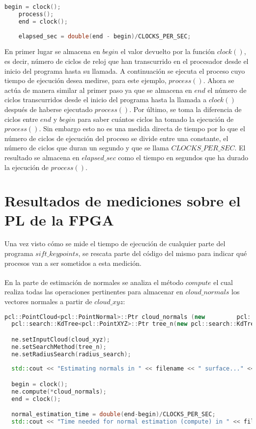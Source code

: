 \begin{lstlisting}[language=C++,breaklines]
	begin = clock();
	process();
	end = clock();
	
	elapsed_sec = double(end - begin)/CLOCKS_PER_SEC;
\end{lstlisting}

En primer lugar se almacena en $begin$ el valor devuelto por la función $clock()$, es decir, número de ciclos de reloj que han transcurrido en el procesador desde el inicio del programa hasta su llamada. A continuación se ejecuta el proceso cuyo tiempo de ejecución desea medirse, para este ejemplo, $process()$. Ahora se actúa de manera similar al primer paso ya que se almacena en $end$ el número de ciclos transcurridos desde el inicio del programa hasta la llamada a $clock()$ después de haberse ejecutado $process()$. Por último, se toma la diferencia de ciclos entre $end$ y $begin$ para saber cuántos ciclos ha tomado la ejecución de $process()$. Sin embargo esto no es una medida directa de tiempo por lo que el número de ciclos de ejecución del proceso se divide entre una constante, el número de ciclos que duran un segundo y que se llama $CLOCKS\_PER\_SEC$. El resultado se almacena en $elapsed\_sec$ como el tiempo en segundos que ha durado la ejecución de $process()$.


\section{Resultados de mediciones sobre el PL de la FPGA}
Una vez visto cómo se mide el tiempo de ejecución de cualquier parte del programa $sift\_keypoints$, se rescata parte del código del mismo para indicar qué procesos van a ser sometidos a esta medición.
\\
\\
En la parte de estimación de normales se analiza el método $compute$ el cual realiza todas las operaciones pertinentes para almacenar en $cloud\_normals$ los vectores normales a partir de $cloud\_xyz$:


\begin{lstlisting}[language=C++,breaklines]
  pcl::PointCloud<pcl::PointNormal>::Ptr cloud_normals (new 		pcl::PointCloud<pcl::PointNormal>);
  pcl::search::KdTree<pcl::PointXYZ>::Ptr tree_n(new pcl::search::KdTree<pcl::PointXYZ>());

  ne.setInputCloud(cloud_xyz);
  ne.setSearchMethod(tree_n);
  ne.setRadiusSearch(radius_search);
 
  std::cout << "Estimating normals in " << filename << " surface..." <<std::endl;

  begin = clock();
  ne.compute(*cloud_normals);
  end = clock();

  normal_estimation_time = double(end-begin)/CLOCKS_PER_SEC;
  std::cout << "Time needed for normal estimation (compute) in " << filename << ": " << normal_estimation_time << " seconds" << std::endl << std::endl;
\end{lstlisting}

